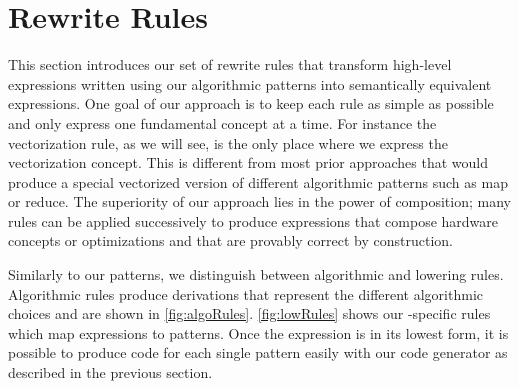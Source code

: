 \section{Rewrite Rules}
\label{section:rules}

This section introduces our set of rewrite rules that transform high-level expressions written using our algorithmic patterns into semantically equivalent expressions.
One goal of our approach is to keep each rule as simple as possible and only express one fundamental concept at a time.
For instance the vectorization rule, as we will see, is the only place where we express the vectorization concept.
This is different from most prior approaches that would produce a special vectorized version of different algorithmic patterns such as map or reduce.
The superiority of our approach lies in the power of composition;
many rules can be applied successively to produce expressions that compose hardware concepts or optimizations and that are provably correct by construction.

Similarly to our patterns, we distinguish between algorithmic and lowering rules.
Algorithmic rules produce derivations that represent the different algorithmic choices and are shown in \autoref{fig:algoRules}.
\autoref{fig:lowRules} shows our \OpenCL-specific rules which map expressions to \OpenCL patterns.
Once the expression is in its lowest form, it is possible to produce \OpenCL code for each single pattern easily with our code generator as described in the previous section.





